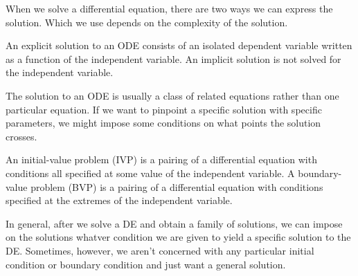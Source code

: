 \documentclass[../m082main.tex]{subfiles}
\begin{document}
When we solve a differential equation, there are two ways we can express the solution.
Which we use depends on the complexity of the solution.

\begin{definition}
    An explicit solution to an ODE consists of an isolated dependent variable written as a function of the independent variable.
    An implicit solution is not solved for the independent variable.
\end{definition}

The solution to an ODE is usually a class of related equations rather than one particular equation.
If we want to pinpoint a specific solution with specific parameters, we might impose some conditions on what points the solution crosses.

\begin{definition}
    An initial-value problem (IVP) is a pairing of a differential equation with conditions all specified at some value of the independent variable.
    A boundary-value problem (BVP) is a pairing of a differential equation with conditions specified at the extremes of the independent variable.
\end{definition}

In general, after we solve a DE and obtain a family of solutions, we can impose on the solutions whatver condition we are given to yield a specific solution to the DE.
Sometimes, however, we aren't concerned with any particular initial condition or boundary condition and just want a general solution.
\end{document}
